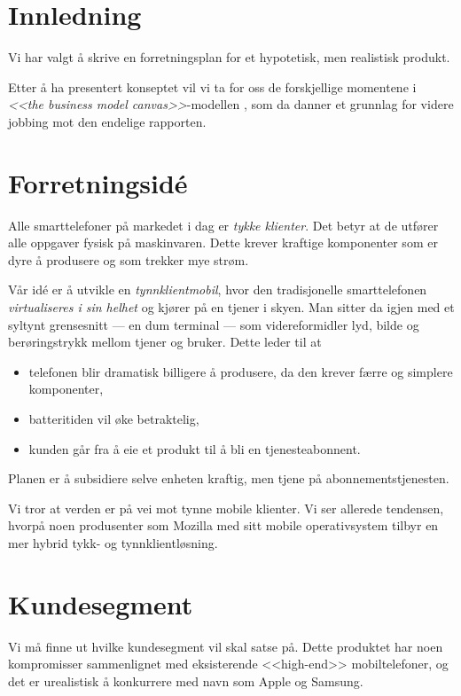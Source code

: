 \section{Innledning}

Vi har valgt å skrive en forretningsplan for et hypotetisk, men realistisk
produkt.

Etter å ha presentert konseptet vil vi ta for oss de forskjellige momentene i
\textit{<<the business model canvas>>}-modellen \cite{osterwalder}, som da
danner et grunnlag for videre jobbing mot den endelige rapporten.

\section{Forretningsidé}

Alle smarttelefoner på markedet i dag er \textit{tykke klienter}. Det betyr at
de utfører alle oppgaver fysisk på maskinvaren. Dette krever kraftige
komponenter som er dyre å produsere og som trekker mye strøm.

Vår idé er å utvikle en \textit{tynnklientmobil}, hvor den tradisjonelle
smarttelefonen \textit{virtualiseres i sin helhet} og kjører på en tjener i
skyen. Man sitter da igjen med et syltynt grensesnitt --- en dum terminal ---
som videreformidler lyd, bilde og berøringstrykk mellom tjener og bruker. Dette
leder til at

\begin{itemize}
  \item telefonen blir dramatisk billigere å produsere, da den krever færre og
    simplere komponenter,
  \item batteritiden vil øke betraktelig,
  \item kunden går fra å eie et produkt til å bli en tjenesteabonnent.
\end{itemize}

Planen er å subsidiere selve enheten kraftig, men tjene på
abonnementstjenesten.

Vi tror at verden er på vei mot tynne mobile klienter. Vi ser allerede
tendensen, hvorpå noen produsenter som Mozilla med sitt mobile operativsystem
tilbyr en mer hybrid tykk- og tynnklientløsning.

\section{Kundesegment}

Vi må finne ut hvilke kundesegment vil skal satse på. Dette produktet har noen
kompromisser sammenlignet med eksisterende <<high-end>> mobiltelefoner, og det
er urealistisk å konkurrere med navn som Apple og Samsung.

